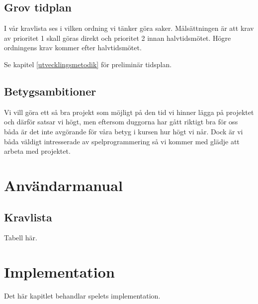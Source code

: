 \documentclass{article}
\begin{document}
\subsection{Grov tidplan}
I vår kravlista ses i vilken ordning vi tänker göra saker. Målsättningen är att krav av prioritet 1 skall göras direkt och prioritet 2 innan halvtidsmötet. Högre ordningens krav kommer efter halvtidsmötet.

Se kapitel \ref{utvecklingsmetodik} för preliminär tidsplan.

\subsection{Betygsambitioner}
Vi vill göra ett så bra projekt som möjligt på den tid vi hinner lägga på projektet och därför satsar vi högt, men eftersom duggorna har gått riktigt bra för oss båda är det inte avgörande för våra betyg i kursen hur högt vi når. Dock är vi båda väldigt intresserade av spelprogrammering så vi kommer med glädje att arbeta med projektet.

\section{Användarmanual}

\subsection{Kravlista}
Tabell här.

\section{Implementation}
Det här kapitlet behandlar spelets implementation.
\end{document}
